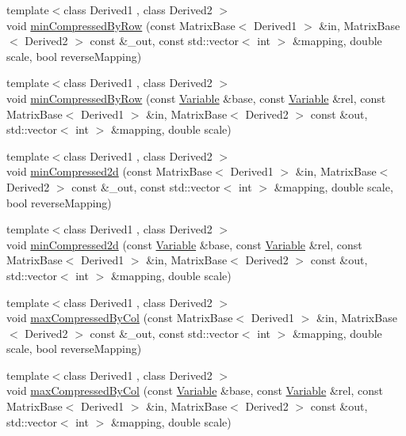 \begin{DoxyCompactItemize}
\item 
{\footnotesize template$<$class Derived1 , class Derived2 $>$ }\\void \hyperlink{namespaceocra_1_1utils_ae8dc2eb14db238a75ea0a8bf499e4902}{min\+Compressed\+By\+Row} (const Matrix\+Base$<$ Derived1 $>$ \&in, Matrix\+Base$<$ Derived2 $>$ const \&\+\_\+out, const std\+::vector$<$ int $>$ \&mapping, double scale, bool reverse\+Mapping)
\item 
{\footnotesize template$<$class Derived1 , class Derived2 $>$ }\\void \hyperlink{namespaceocra_1_1utils_af79aa2317a885467a28ba54e7b287ec8}{min\+Compressed\+By\+Row} (const \hyperlink{classocra_1_1Variable}{Variable} \&base, const \hyperlink{classocra_1_1Variable}{Variable} \&rel, const Matrix\+Base$<$ Derived1 $>$ \&in, Matrix\+Base$<$ Derived2 $>$ const \&out, std\+::vector$<$ int $>$ \&mapping, double scale)
\item 
{\footnotesize template$<$class Derived1 , class Derived2 $>$ }\\void \hyperlink{namespaceocra_1_1utils_aef09b232677b6a4a8d6177c04345f1d3}{min\+Compressed2d} (const Matrix\+Base$<$ Derived1 $>$ \&in, Matrix\+Base$<$ Derived2 $>$ const \&\+\_\+out, const std\+::vector$<$ int $>$ \&mapping, double scale, bool reverse\+Mapping)
\item 
{\footnotesize template$<$class Derived1 , class Derived2 $>$ }\\void \hyperlink{namespaceocra_1_1utils_a9b0fce276b5edf71568e40517bf567ac}{min\+Compressed2d} (const \hyperlink{classocra_1_1Variable}{Variable} \&base, const \hyperlink{classocra_1_1Variable}{Variable} \&rel, const Matrix\+Base$<$ Derived1 $>$ \&in, Matrix\+Base$<$ Derived2 $>$ const \&out, std\+::vector$<$ int $>$ \&mapping, double scale)
\item 
{\footnotesize template$<$class Derived1 , class Derived2 $>$ }\\void \hyperlink{namespaceocra_1_1utils_a9de6baf9d21a683ff798695ac099055a}{max\+Compressed\+By\+Col} (const Matrix\+Base$<$ Derived1 $>$ \&in, Matrix\+Base$<$ Derived2 $>$ const \&\+\_\+out, const std\+::vector$<$ int $>$ \&mapping, double scale, bool reverse\+Mapping)
\item 
{\footnotesize template$<$class Derived1 , class Derived2 $>$ }\\void \hyperlink{namespaceocra_1_1utils_a86da8040ccbcb2a583b7e628dc8265ea}{max\+Compressed\+By\+Col} (const \hyperlink{classocra_1_1Variable}{Variable} \&base, const \hyperlink{classocra_1_1Variable}{Variable} \&rel, const Matrix\+Base$<$ Derived1 $>$ \&in, Matrix\+Base$<$ Derived2 $>$ const \&out, std\+::vector$<$ int $>$ \&mapping, double scale)

\end{DoxyCompactItemize}
